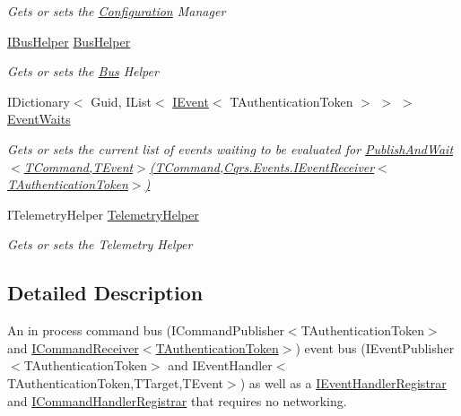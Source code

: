 \begin{DoxyCompactItemize}
\begin{DoxyCompactList}\small\item\em Gets or sets the \hyperlink{namespaceCqrs_1_1Configuration}{Configuration} Manager \end{DoxyCompactList}\item 
\hyperlink{interfaceCqrs_1_1Bus_1_1IBusHelper}{I\+Bus\+Helper} \hyperlink{classCqrs_1_1Bus_1_1InProcessBus_a5dd1cb40277f3e04e743dd8cd63523ff}{Bus\+Helper}
\begin{DoxyCompactList}\small\item\em Gets or sets the \hyperlink{namespaceCqrs_1_1Bus}{Bus} Helper \end{DoxyCompactList}\item 
I\+Dictionary$<$ Guid, I\+List$<$ \hyperlink{interfaceCqrs_1_1Events_1_1IEvent}{I\+Event}$<$ T\+Authentication\+Token $>$ $>$ $>$ \hyperlink{classCqrs_1_1Bus_1_1InProcessBus_a84de47f021786b0400e0635ec68b4ec1}{Event\+Waits}
\begin{DoxyCompactList}\small\item\em Gets or sets the current list of events waiting to be evaluated for \hyperlink{classCqrs_1_1Bus_1_1InProcessBus_a38c0684e313f42bfb36b40703db94ccb}{Publish\+And\+Wait$<$\+T\+Command,\+T\+Event$>$(\+T\+Command,\+Cqrs.\+Events.\+I\+Event\+Receiver$<$\+T\+Authentication\+Token$>$)} \end{DoxyCompactList}\item 
I\+Telemetry\+Helper \hyperlink{classCqrs_1_1Bus_1_1InProcessBus_aeb193bb8b08276db30dd376696726893}{Telemetry\+Helper}
\begin{DoxyCompactList}\small\item\em Gets or sets the Telemetry Helper \end{DoxyCompactList}\end{DoxyCompactItemize}


\subsection{Detailed Description}
An in process command bus (I\+Command\+Publisher$<$\+T\+Authentication\+Token$>$ and \hyperlink{interfaceCqrs_1_1Commands_1_1ICommandReceiver}{I\+Command\+Receiver$<$\+T\+Authentication\+Token$>$}) event bus (I\+Event\+Publisher$<$\+T\+Authentication\+Token$>$ and I\+Event\+Handler$<$\+T\+Authentication\+Token,\+T\+Target,\+T\+Event$>$) as well as a \hyperlink{interfaceCqrs_1_1Bus_1_1IEventHandlerRegistrar}{I\+Event\+Handler\+Registrar} and \hyperlink{interfaceCqrs_1_1Bus_1_1ICommandHandlerRegistrar}{I\+Command\+Handler\+Registrar} that requires no networking. 



